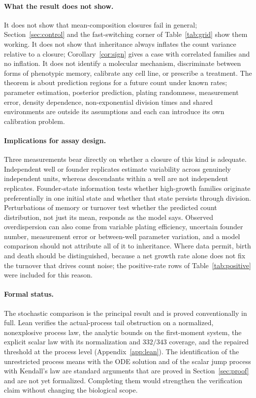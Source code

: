 \documentclass[11pt,a4paper]{article}
\theoremstyle{plain}
\theoremstyle{definition}
\theoremstyle{remark}
\begin{document}
\paragraph{What the result does not show.} It does not show that mean-composition closures fail in general; Section~\ref{sec:control} and the fast-switching corner of Table~\ref{tab:grid} show them working. It does not show that inheritance always inflates the count variance relative to a closure; Corollary~\ref{cor:sign} gives a case with correlated families and no inflation. It does not identify a molecular mechanism, discriminate between forms of phenotypic memory, calibrate any cell line, or prescribe a treatment. The theorem is about prediction regions for a future count under known rates; parameter estimation, posterior prediction, plating randomness, measurement error, density dependence, non-exponential division times and shared environments are outside its assumptions and each can introduce its own calibration problem.

\paragraph{Implications for assay design.} Three measurements bear directly on whether a closure of this kind is adequate. Independent well or founder replicates estimate variability across genuinely independent units, whereas descendants within a well are not independent replicates. Founder-state information tests whether high-growth families originate preferentially in one initial state and whether that state persists through division. Perturbations of memory or turnover test whether the predicted count distribution, not just its mean, responds as the model says. Observed overdispersion can also come from variable plating efficiency, uncertain founder number, measurement error or between-well parameter variation, and a model comparison should not attribute all of it to inheritance. Where data permit, birth and death should be distinguished, because a net growth rate alone does not fix the turnover that drives count noise; the positive-rate rows of Table~\ref{tab:positive} were included for this reason.

\paragraph{Formal status.} The stochastic comparison is the principal result and is proved conventionally in full. Lean verifies the actual-process tail obstruction on a normalized, nonexplosive process law, the analytic bounds on the first-moment system, the explicit scalar law with its normalization and $332/343$ coverage, and the repaired threshold at the process level (Appendix~\ref{app:lean}). The identification of the unrestricted process means with the ODE solution and of the scalar jump process with Kendall's law are standard arguments that are proved in Section~\ref{sec:proof} and are not yet formalized. Completing them would strengthen the verification claim without changing the biological scope.
\end{document}
